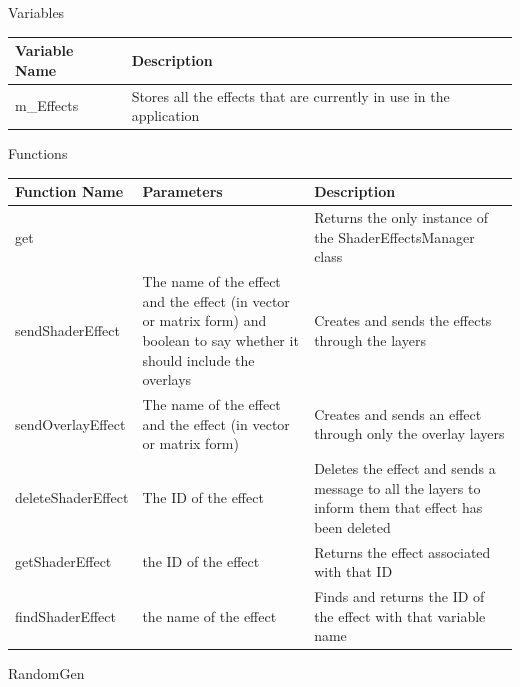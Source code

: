 \documentclass{article}
\begin{document}
                \begin{center}
                    Variables
                    \begin{tabular}{ | m{} | m{} | }
                        \hline
                        \textbf{Variable Name} & \textbf{Description} \\
                        \hline
                        m\_Effects & Stores all the effects that are currently in use in the application \\
                        \hline
                    \end{tabular}
                    Functions
                    \begin{tabular}{ | m{} | m{}| m{} | }
                        \hline
                        \textbf{Function Name} & \textbf{Parameters} & \textbf{Description} \\
                        \hline
                        get & & Returns the only instance of the ShaderEffectsManager class \\
                        \hline
                        sendShaderEffect & The name of the effect and the effect (in vector or matrix form) and boolean to say whether it should include the overlays & Creates and sends the effects through the layers \\
                        \hline
                        sendOverlayEffect & The name of the effect and the effect (in vector or matrix form) & Creates and sends an effect through only the overlay layers \\
                        \hline
                        deleteShaderEffect & The ID of the effect & Deletes the effect and sends a message to all the layers to inform them that effect has been deleted \\
                        \hline
                        getShaderEffect & the ID of the effect & Returns the effect associated with that ID \\
                        \hline
                        findShaderEffect & the name of the effect & Finds and returns the ID of the effect with that variable name \\
                        \hline
                    \end{tabular}
                \end{center}
                RandomGen
\end{document}
